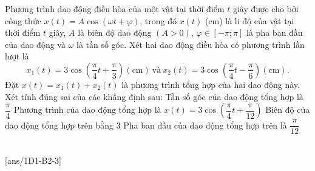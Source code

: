 \begin{ex}%
	Phương trình dao động điều hòa của một vật tại thời điểm $t$ giây được cho bởi công thức $x(t)=A\cos \left(\omega t+\varphi \right)$, trong đó $x(t) $ (cm)  là li độ của vật tại thời điểm $t$ giây, $A$ là biên độ dao động $(A>0)$, $\varphi \in [-\pi; \pi]$ là pha ban đầu của dao động và $\omega$ là tần số góc. Xét hai dao động điều hòa có phương trình lần lượt là
	$$x_1(t)=3\cos\left(\dfrac{\pi}{4}t+\dfrac{\pi}{3}\right)  (\text{cm})\ \text{và} \ x_2(t)=3\cos\left(\dfrac{\pi}{4}t-\dfrac{\pi}{6}\right)  (\text{cm}). $$
	Đặt $x(t)=x_1(t)+x_2(t)$ là phương trình tổng hợp của hai dao động này.
	Xét tính đúng sai của các khẳng định sau:
	\choiceTF
	{\True Tần số góc của dao động tổng hợp là $\dfrac{\pi}{4}$}
	{Phương trình của dao động tổng hợp là $x(t)=3\cos\left(\dfrac{\pi}{4}t+\dfrac{\pi}{12}\right)$}
	{Biên độ của dao động tổng hợp trên bằng $3$}
	{\True Pha ban đầu của dao động tổng hợp trên là $\dfrac{\pi}{12}$ }
\end{ex}


 \\
[ans/1D1-B2-3]

